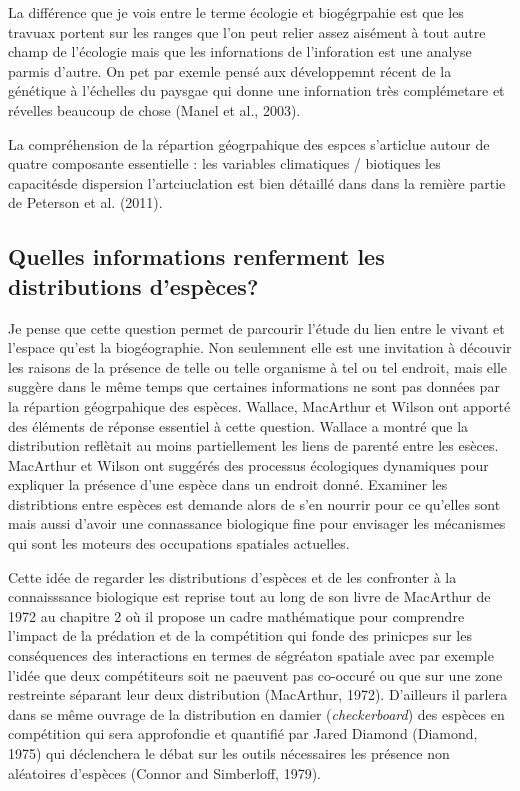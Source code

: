 La différence que je vois entre le terme écologie et biogégrpahie est
que les travuax portent sur les ranges que l'on peut relier assez
aisément à tout autre champ de l'écologie mais que les infornations de
l'inforation est une analyse parmis d'autre. On pet par exemle pensé aux
développemnt récent de la génétique à l'échelles du paysgae qui donne
une infornation très complémetare et révelles beaucoup de chose (Manel
et al., 2003).

La compréhension de la répartion géogrpahique des espces s'articlue
autour de quatre composante essentielle : les variables climatiques /
biotiques les capacitésde dispersion l'artciuclation est bien détaillé
dans dans la remière partie de Peterson et al. (2011).

\subsection*{Quelles informations renferment les distributions
d'espèces?}\label{quelles-informations-renferment-les-distributions-despuxe8ces}

Je pense que cette question permet de parcourir l'étude du lien entre le
vivant et l'espace qu'est la biogéographie. Non seulemnent elle est une
invitation à découvir les raisons de la présence de telle ou telle
organisme à tel ou tel endroit, mais elle suggère dans le même temps que
certaines informations ne sont pas données par la répartion géogrpahique
des espèces. Wallace, MacArthur et Wilson ont apporté des éléments de
réponse essentiel à cette question. Wallace a montré que la distribution
reflètait au moins partiellement les liens de parenté entre les esèces.
MacArthur et Wilson ont suggérés des processus écologiques dynamiques
pour expliquer la présence d'une espèce dans un endroit donné. Examiner
les distribtions entre espèces est demande alors de s'en nourrir pour ce
qu'elles sont mais aussi d'avoir une connassance biologique fine pour
envisager les mécanismes qui sont les moteurs des occupations spatiales
actuelles.

Cette idée de regarder les distributions d'espèces et de les confronter
à la connaisssance biologique est reprise tout au long de son livre de
MacArthur de 1972 au chapitre 2 où il propose un cadre mathématique pour
comprendre l'impact de la prédation et de la compétition qui fonde des
prinicpes sur les conséquences des interactions en termes de ségréaton
spatiale avec par exemple l'idée que deux compétiteurs soit ne paeuvent
pas co-occuré ou que sur une zone restreinte séparant leur deux
distribution (MacArthur, 1972). D'ailleurs il parlera dans se même
ouvrage de la distribution en damier (\emph{checkerboard}) des espèces
en compétition qui sera approfondie et quantifié par Jared Diamond
(Diamond, 1975) qui déclenchera le débat sur les outils nécessaires les
présence non aléatoires d'espèces (Connor and Simberloff, 1979).

